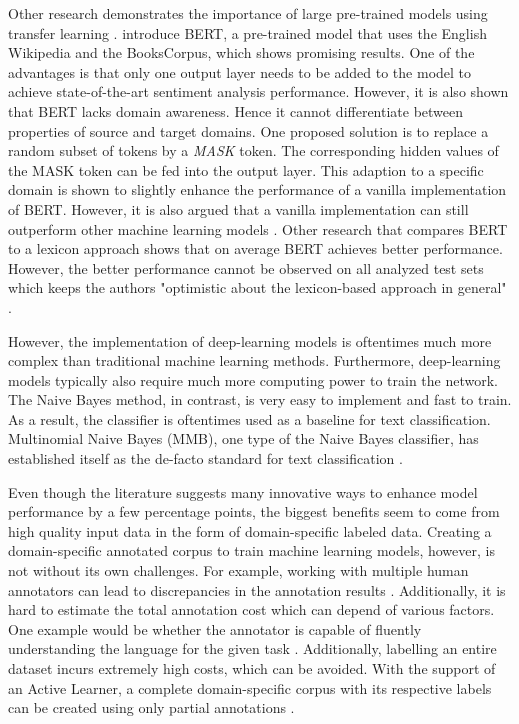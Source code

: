 \documentclass[11pt, a4paper]{article}
\begin{document}
Other research demonstrates the importance of large pre-trained models using transfer learning \citep{deng2009transferlearning}.
\cite{devlin2019bert} introduce BERT, a pre-trained model that uses the English Wikipedia and the BooksCorpus, which shows promising results.
One of the advantages is that only one output layer needs to be added to the model to achieve state-of-the-art sentiment analysis performance.
However, it is also shown that BERT lacks domain awareness. Hence it cannot differentiate between properties of source and target domains. One
proposed solution is to replace a random subset of tokens by a \emph{MASK} token. The corresponding hidden values of the MASK token can be fed
into the output layer. This adaption to a specific domain is shown to slightly enhance the performance of a vanilla implementation of BERT. However,
it is also argued that a vanilla implementation can still outperform other machine learning models \citep{Du2020AdversarialAD}. Other research that compares BERT to a
lexicon approach shows that on average BERT achieves better performance. However, the better performance cannot be observed on all analyzed test sets
which keeps the authors "optimistic about the lexicon-based approach in general" \citep{kotelnikova2021lexiconbased}. %

However, the implementation of deep-learning models is oftentimes much more complex than traditional machine learning methods. Furthermore, deep-learning models typically
also require much more computing power to train the network. The Naive Bayes method, in contrast, is very easy to implement and fast to train. As a
result, the classifier is oftentimes used as a baseline for text classification. Multinomial Naive Bayes (MMB), one type of the Naive Bayes classifier, has established
itself as the de-facto standard for text classification \citep{abbas2019mnb}.

Even though the literature suggests many 
innovative ways to enhance model performance by a few percentage points, the biggest benefits seem to come from high quality 
input data in the form of domain-specific labeled data.
Creating a domain-specific annotated corpus to train machine learning models, however, is not without its own challenges. 
For example, working with multiple human annotators can lead to discrepancies in the annotation results \citep{kim2008corpusannotation, rayan2019sentimentanalysisemail}. 
Additionally, it is hard to estimate the total annotation cost which can depend of various factors. One example would be whether the annotator is capable of fluently understanding 
the language for the given task \citep{arora2009estimationgannotationcost}. Additionally, labelling an entire dataset incurs extremely high costs, 
which can be avoided. With the support of an Active Learner, a complete domain-specific corpus with its respective labels can be 
created using only partial annotations \citep{park2015EfficientExtraction}. 
\end{document}
